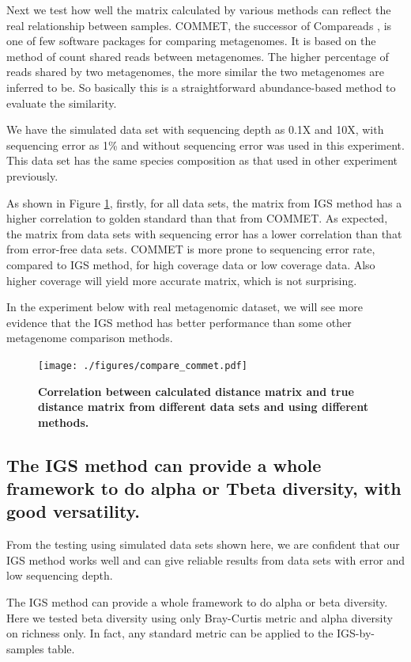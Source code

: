 Next we test how well the matrix calculated by various methods can reflect the
real relationship between samples. COMMET\cite{DBLP:conf/bibm/MailletCVLP14}, 
the successor of Compareads \cite{Maillet2012}, is one
of few software packages for comparing metagenomes. It is based on the method of
count shared reads between metagenomes. The higher percentage of reads
shared by two metagenomes, the more similar the two metagenomes are inferred to be. So
basically this is a straightforward abundance-based method to evaluate the
similarity.

We have the simulated data set with sequencing depth as 0.1X and 10X, with 
sequencing error as 1\% and without sequencing error was used in this experiment.
This data set has the same species composition as that used in other experiment previously.

As shown in Figure \ref{fig:compare_commet}, firstly, for 
all data sets, the matrix from IGS method has a higher 
correlation to golden standard than that from COMMET. As expected, 
the matrix from data sets with sequencing error has a lower correlation 
than that from error-free
data sets. COMMET is more prone to sequencing error rate, compared to 
IGS method, for high coverage data or low coverage data.
Also higher coverage will yield more accurate matrix, which is not surprising.

In the experiment below with real metagenomic dataset, we will see more evidence
that the IGS method has better performance than some other metagenome comparison methods.

\begin{figure}[!ht]
 \centerline{\texttt{[image: ./figures/compare\_commet.pdf]}}
\caption{\bf Correlation between calculated distance matrix and true distance matrix
from different data sets and using different methods.}
\label{fig:compare_commet}
\end{figure}

\subsection{The IGS method can provide a whole framework to do alpha or 
Tbeta diversity, with good versatility.}

From the testing using simulated data sets shown here, we are confident that 
our IGS method works well and can give reliable results from data sets with 
error and low sequencing depth.

The IGS method can provide a whole framework to do alpha or beta diversity. 
Here we tested beta diversity using only Bray-Curtis metric and alpha 
diversity on richness only. In fact, any standard metric can be applied to the 
IGS-by-samples table.

